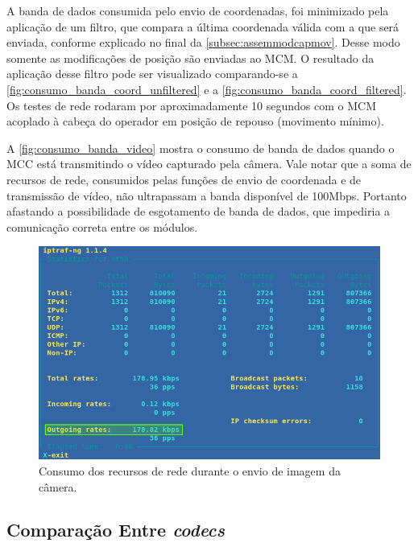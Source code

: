 A banda de dados consumida pelo envio de coordenadas, foi minimizado pela aplicação de um filtro, que compara a última coordenada válida com a que será enviada, conforme explicado no final da \autoref{subsec:assemmodcapmov}. Desse modo somente as modificações de posição são enviadas ao MCM. O resultado da aplicação desse filtro pode ser visualizado comparando-se a \autoref{fig:consumo_banda_coord_unfiltered} e a \autoref{fig:consumo_banda_coord_filtered}. Os testes de rede rodaram por aproximadamente 10 segundos com o MCM acoplado à cabeça do operador em posição de repouso (movimento mínimo).\par

A \autoref{fig:consumo_banda_video} mostra o consumo de banda de dados quando o MCC está transmitindo o vídeo capturado pela câmera. Vale notar que a soma de recursos de rede, consumidos pelas funções de envio de coordenada e de transmissão de vídeo, não ultrapassam a banda disponível de 100Mbps. Portanto afastando a possibilidade de esgotamento de banda de dados, que impediria a comunicação correta entre os módulos.\par

\begin{figure}[H]
	\centering
	\includegraphics[width=1\textwidth]{figuras/consumo_banda_camera.png}
	\caption{Consumo dos recursos de rede durante o envio de imagem da câmera.}
	\label{fig:consumo_banda_video}
\end{figure}

\subsection{Comparação Entre \textit{codecs}}
\label{subsec:compcodecs}

